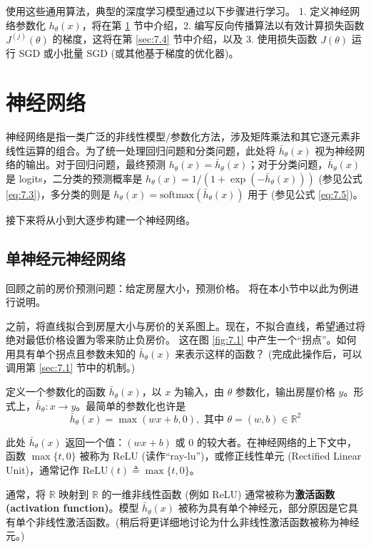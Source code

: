 使用这些通用算法，典型的深度学习模型通过以下步骤进行学习。 1. 定义神经网络参数化 $h_\theta(x)$，将在第 \ref{sec:7.2} 节中介绍，2. 编写反向传播算法以有效计算损失函数 $J^{(j)}(\theta)$ 的梯度，这将在第 \ref{sec:7.4} 节中介绍，以及 3. 使用损失函数 $J(\theta)$ 运行 SGD 或小批量 SGD (或其他基于梯度的优化器)。

\section{神经网络}\label{sec:7.2}

神经网络是指一类广泛的非线性模型/参数化方法，涉及矩阵乘法和其它逐元素非线性运算的组合。为了统一处理回归问题和分类问题，此处将 $\bar{h}_\theta(x)$ 视为神经网络的输出。对于回归问题，最终预测 $h_\theta(x) = \bar{h}_\theta(x)$；对于分类问题，$\bar{h}_\theta(x)$ 是 logits，二分类的预测概率是 $h_\theta(x) = 1/(1+\exp(-\bar{h}_\theta(x)))$ (参见公式 \eqref{eq:7.3})，多分类的则是 $h_\theta(x) = \text{softmax}(\bar{h}_\theta(x))$ 用于 (参见公式 \eqref{eq:7.5})。

接下来将从小到大逐步构建一个神经网络。

\subsection*{单神经元神经网络}

回顾之前的房价预测问题：给定房屋大小，预测价格。 将在本小节中以此为例进行说明。

之前，将直线拟合到房屋大小与房价的关系图上。现在，不拟合直线，希望通过将绝对最低价格设置为零来防止负房价。 这在图 \ref{fig:7.1} 中产生一个“拐点”。如何用具有单个拐点且参数未知的 $\bar{h}_\theta(x)$ 来表示这样的函数？ (完成此操作后，可以调用第 \ref{sec:7.1} 节中的机制。)

定义一个参数化的函数 $\bar{h}_\theta(x)$，以 $x$ 为输入，由 $\theta$ 参数化，输出房屋价格 $y$。形式上，$\bar{h}_\theta: x \to y$。最简单的参数化也许是
\begin{equation}
    \bar{h}_\theta(x) = \max(wx + b, 0), \text{ 其中 } \theta = (w, b) \in \mathbb{R}^2
    \label{eq:7.11}
\end{equation}

此处 $\bar{h}_\theta(x)$ 返回一个值：$(wx+b)$ 或 0 的较大者。在神经网络的上下文中，函数 $\max\{t, 0\}$ 被称为 ReLU (读作“ray-lu”)，或修正线性单元 (Rectified Linear Unit)，通常记作 $\text{ReLU}(t) \triangleq \max\{t, 0\}$。

通常，将 $\mathbb{R}$ 映射到 $\mathbb{R}$ 的一维非线性函数 (例如 ReLU) 通常被称为\textbf{激活函数 (activation function)}。模型 $\bar{h}_\theta(x)$ 被称为具有单个神经元，部分原因是它具有单个非线性激活函数。(稍后将更详细地讨论为什么非线性激活函数被称为神经元。)

